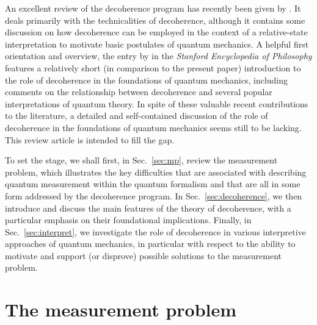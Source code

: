 \documentclass[rmp,aps,amsmath,amsfonts,noshowkeys,noshowpacs,12pt]{revtex4}
\begin{document}
An excellent review of the decoherence program has recently been given
by \citet{Zurek:2002:ii}. It deals primarily with the technicalities
of decoherence, although it contains some discussion on how
decoherence can be employed in the context of a relative-state
interpretation to motivate basic postulates of quantum mechanics.  A
helpful first orientation and overview, the entry by
\citet{Bacciagaluppi:2003:yz} in the {\em Stanford Encyclopedia of
  Philosophy} features a relatively short (in comparison to the
present paper) introduction to the role of decoherence in the
foundations of quantum mechanics, including comments on the
relationship between decoherence and several popular interpretations
of quantum theory.  In spite of these valuable recent contributions to
the literature, a detailed and self-contained discussion of the role
of decoherence in the foundations of quantum mechanics seems still to
be lacking. This review article is intended to fill the gap.

To set the stage, we shall first, in Sec.~\ref{sec:mp}, review the
measurement problem, which illustrates the key difficulties that are
associated with describing quantum measurement within the quantum
formalism and that are all in some form addressed by the decoherence
program. In Sec.~\ref{sec:decoherence}, we then introduce and discuss
the main features of the theory of decoherence, with a particular
emphasis on their foundational implications.  Finally, in
Sec.~\ref{sec:interpret}, we investigate the role of decoherence in
various interpretive approaches of quantum mechanics, in particular
with respect to the ability to motivate and support (or disprove)
possible solutions to the measurement problem.


\section{\label{sec:mp}The measurement problem}
\end{document}
